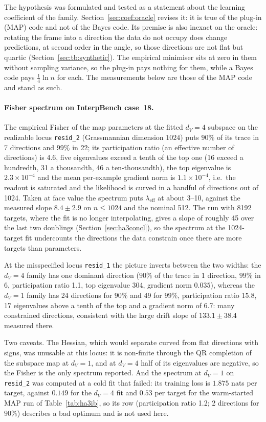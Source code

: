 \documentclass[11pt,a4paper]{article}
\newcommand{\dv}{d_V}
\begin{document}
The hypothesis was formulated and tested as a statement about the learning coefficient of the family. Section~\ref{sec:coef:oracle} revises it: it is true of the plug-in (MAP) code and not of the Bayes code. Its premise is also inexact on the oracle: rotating the frame into a direction the data do not occupy does change predictions, at second order in the angle, so those directions are not flat but quartic (Section~\ref{sec:tb:synthetic}). The empirical minimiser sits at zero in them without sampling variance, so the plug-in pays nothing for them, while a Bayes code pays $\tfrac14\ln n$ for each. The measurements below are those of the MAP code and stand as such.

\paragraph{Fisher spectrum on InterpBench case~18.} The empirical Fisher of the map parameters at the fitted $\dv=4$ subspace on the realizable locus \texttt{resid\_2} (Grassmannian dimension $1024$) puts $90\%$ of its trace in 7 directions and $99\%$ in 22; its participation ratio (an effective number of directions) is 4.6, five eigenvalues exceed a tenth of the top one (16 exceed a hundredth, 31 a thousandth, 46 a ten-thousandth), the top eigenvalue is $2.3\times10^{-4}$ and the mean per-example gradient norm is $1.1\times10^{-4}$, i.e.\ the readout is saturated and the likelihood is curved in a handful of directions out of 1024. Taken at face value the spectrum puts $\lambda_{\mathrm{eff}}$ at about 3--10, against the measured slope $8.4\pm2.9$ on $n\le1024$ and the nominal 512. The run with 8192 targets, where the fit is no longer interpolating, gives a slope of roughly 45 over the last two doublings (Section~\ref{sec:ha3concl}), so the spectrum at the 1024-target fit undercounts the directions the data constrain once there are more targets than parameters.

At the misspecified locus \texttt{resid\_1} the picture inverts between the two widths: the $\dv=4$ family has one dominant direction ($90\%$ of the trace in 1 direction, $99\%$ in 6, participation ratio 1.1, top eigenvalue 304, gradient norm $0.035$), whereas the $\dv=1$ family has 24 directions for $90\%$ and 49 for $99\%$, participation ratio 15.8, 17 eigenvalues above a tenth of the top and a gradient norm of 6.7: many constrained directions, consistent with the large drift slope of $133.1\pm38.4$ measured there.

Two caveats. The Hessian, which would separate curved from flat directions with signs, was unusable at this locus: it is non-finite through the QR completion of the subspace map at $\dv=1$, and at $\dv=4$ half of its eigenvalues are negative, so the Fisher is the only spectrum reported. And the spectrum at $\dv=1$ on \texttt{resid\_2} was computed at a cold fit that failed: its training loss is $1.875$ nats per target, against $0.149$ for the $\dv=4$ fit and $0.53$ per target for the warm-started MAP run of Table~\ref{tab:ha3ib}, so its row (participation ratio 1.2; 2 directions for $90\%$) describes a bad optimum and is not used here.
\end{document}
